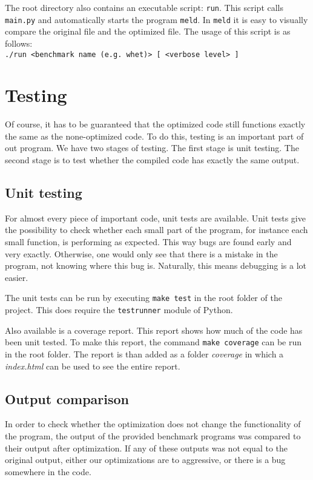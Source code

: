 \documentclass[10pt,a4paper]{article}
\begin{document}
The root directory also contains an executable script: \texttt{run}. This
script calls \texttt{main.py} and automatically starts the program
\texttt{meld}.  In \texttt{meld} it is easy to visually compare the original
file and the optimized file. The usage of this script is as follows: \\
\texttt{./run <benchmark name (e.g. whet)> [ <verbose level> ]}

\section{Testing}

Of course, it has to be guaranteed that the optimized code still functions
exactly the same as the none-optimized code. To do this, testing is an
important part of out program. We have two stages of testing. The first stage
is unit testing. The second stage is to test whether the compiled code has
exactly the same output.

\subsection{Unit testing}

For almost every piece of important code, unit tests are available. Unit tests
give the possibility to check whether each small part of the program, for
instance each small function, is performing as expected. This way bugs are
found early and very exactly. Otherwise, one would only see that there is a
mistake in the program, not knowing where this bug is. Naturally, this means
debugging is a lot easier.

The unit tests can be run by executing \texttt{make test} in the root folder of
the project. This does require the \texttt{testrunner} module of Python.

Also available is a coverage report. This report shows how much of the code has
been unit tested. To make this report, the command \texttt{make coverage} can
be run in the root folder. The report is than added as a folder \emph{coverage}
in which a \emph{index.html} can be used to see the entire report.

\subsection{Output comparison}

In order to check whether the optimization does not change the functionality of
the program, the output of the provided benchmark programs was compared to
their output after optimization. If any of these outputs was not equal to the
original output, either our optimizations are to aggressive, or there is a bug
somewhere in the code.
\end{document}
